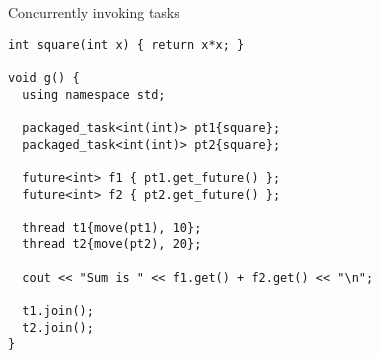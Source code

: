 \begin{frame}[t,fragile]{Concurrently invoking tasks}
\begin{lstlisting}
int square(int x) { return x*x; }

void g() {
  using namespace std;

  packaged_task<int(int)> pt1{square};
  packaged_task<int(int)> pt2{square};

  future<int> f1 { pt1.get_future() };
  future<int> f2 { pt2.get_future() };

  thread t1{move(pt1), 10};
  thread t2{move(pt2), 20};

  cout << "Sum is " << f1.get() + f2.get() << "\n";

  t1.join();
  t2.join();
}
\end{lstlisting}
\end{frame}

